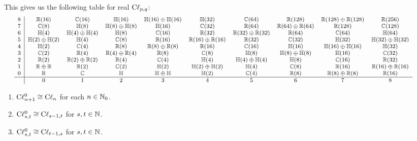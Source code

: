 \M
This gives us the following table for real $\mathrm{C}\ell_{p,q}$:
\begin{equation*}
  \begin{footnotesize}\hskip-3em
\begin{array}{c|ccccccccc}
  8 & \RR(16)            & \CC(16) & \HH(16) & \HH(16)\oplus\HH(16) & \HH(32) & \CC(64) & \RR(128) & \RR(128)\oplus\RR(128) & \RR(256)\\
  7 & \CC(8)             & \HH(8) & \HH(8)\oplus\HH(8) & \HH(16) & \CC(32) & \RR(64) & \RR(64)\oplus\RR(64) & \RR(128) & \CC(128)\\
  6 & \HH(4)             & \HH(4)\oplus\HH(4) & \HH(8) & \CC(16) & \RR(32) & \RR(32)\oplus\RR(32) & \RR(64) & \CC(64) & \HH(64)\\
  5 & \HH(2)\oplus\HH(2) & \HH(4) & \CC(8) & \RR(16) & \RR(16)\oplus\RR(16) & \RR(32) & \CC(32) & \HH(32) & \HH(32)\oplus\HH(32)\\
  4 & \HH(2)             & \CC(4) & \RR(8) & \RR(8)\oplus\RR(8) & \RR(16) & \CC(16) & \HH(16) & \HH(16)\oplus\HH(16)  & \HH(32)\\
  3 & \CC(2)             & \RR(4) & \RR(4)\oplus\RR(4) & \RR(8) & \CC(8) & \HH(8) & \HH(8)\oplus\HH(8) & \HH(16) & \CC(32)\\
  2 & \RR(2)             & \RR(2)\oplus\RR(2) & \RR(4) & \CC(4) & \HH(4) & \HH(4)\oplus\HH(4) & \HH(8) & \CC(16) & \RR(32)\\
  1 & \RR\oplus\RR       & \RR(2) & \CC(2) & \HH(2) & \HH(2)\oplus\HH(2) & \HH(4) & \CC(8) & \RR(16)  & \RR(16)\oplus\RR(16) \\
  0 & \RR                & \CC    & \HH & \HH\oplus\HH & \HH(2) & \CC(4) & \RR(8) & \RR(8)\oplus\RR(8) & \RR(16) \\\hline
    & 0                  & 1  & 2 & 3 & 4 & 5 & 6 & 7 & 8
\end{array}
  \end{footnotesize}
\end{equation*}

\begin{theorem}\label{thm:lie:spin:even-clifford-isomorphisms}
  \begin{enumerate}
  \item $\mathrm{C}\ell_{n+1}^{0}\cong\mathrm{C}\ell_{n}$ for each $n\in\mathbb{N}_{0}$.
  \item $\mathrm{C}\ell_{s,t}^{0}\cong\mathrm{C}\ell_{s-1,t}$ for $s, t\in\mathbb{N}$.
  \item $\mathrm{C}\ell_{s,t}^{0}\cong\mathrm{C}\ell_{t-1,s}$ for $s, t\in\mathbb{N}$.
  \end{enumerate}
\end{theorem}

